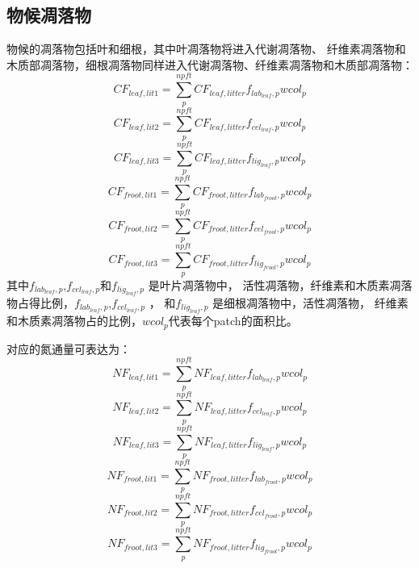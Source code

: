 \subsection{物候凋落物}\label{物候凋落物}
物候的凋落物包括叶和细根，其中叶凋落物将进入代谢凋落物、
纤维素凋落物和木质部凋落物，细根凋落物同样进入代谢凋落物、纤维素凋落物和木质部凋落物：
\begin{equation}
  CF_{leaf,lit1}=\sum_{p}^{npft}{CF_{leaf,litter}f_{lab_{leaf},p}{wcol_p}}
\end{equation}
\begin{equation}
  CF_{leaf,lit2}=\sum_{p}^{npft}{CF_{leaf,litter}f_{cel_{leaf},p}{wcol_p}}
\end{equation}
\begin{equation}
  CF_{leaf,lit3}=\sum_{p}^{npft}{CF_{leaf,litter}f_{lig_{leaf},p}{wcol_p}}
\end{equation}
\begin{equation}
  CF_{froot,lit1}=\sum_{p}^{npft}{CF_{froot,litter}f_{lab_{froot},p}{wcol_p}}
\end{equation}
\begin{equation}
  CF_{froot,lit2}=\sum_{p}^{npft}{CF_{froot,litter}f_{cel_{froot},p}{wcol_p}}
\end{equation}
\begin{equation}
  CF_{froot,lit3}=\sum_{p}^{npft}{CF_{froot,litter}f_{lig_{froot},p}{wcol_p}}
\end{equation}
其中$f_{lab_{leaf},p}$,$f_{cel_{leaf},p}$和$f_{lig_{leaf},p}$ 是叶片凋落物中，
活性凋落物，纤维素和木质素凋落物占得比例，$f_{lab_{leaf},p}$,$f_{cel_{leaf},p}$
， 和$f_{lig_{leaf},p}$ 是细根凋落物中，活性凋落物，
纤维素和木质素凋落物占的比例，${wcol_p}$代表每个patch的面积比。

对应的氮通量可表达为：
\begin{equation}
  NF_{leaf,lit1}=\sum_{p}^{npft}{NF_{leaf,litter}f_{lab_{leaf},p}{wcol_p}}
\end{equation}
\begin{equation}
  NF_{leaf,lit2}=\sum_{p}^{npft}{NF_{leaf,litter}f_{cel_{leaf},p}{wcol_p}}
\end{equation}
\begin{equation}
  NF_{leaf,lit3}=\sum_{p}^{npft}{NF_{leaf,litter}f_{lig_{leaf},p}{wcol_p}}
\end{equation}
\begin{equation}
  NF_{froot,lit1}=\sum_{p}^{npft}{NF_{froot,litter}f_{lab_{froot},p}{wcol_p}}
\end{equation}
\begin{equation}
  NF_{froot,lit2}=\sum_{p}^{npft}{NF_{froot,litter}f_{cel_{froot},p}{wcol_p}}
\end{equation}
\begin{equation}
  NF_{froot,lit3}=\sum_{p}^{npft}{NF_{froot,litter}f_{lig_{froot},p}{wcol_p}}
\end{equation}
